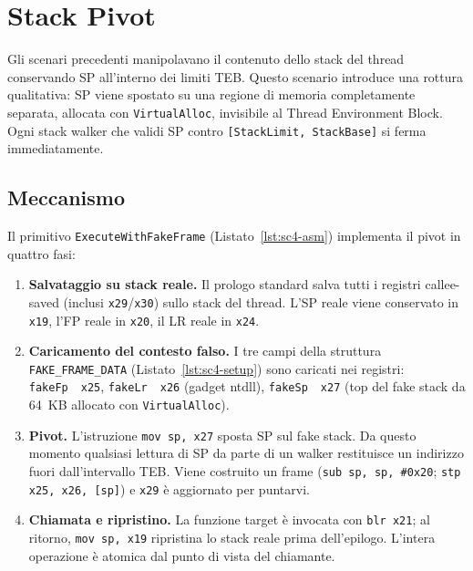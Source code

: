 
\section{Stack Pivot}
\label{sec:sc4}

Gli scenari precedenti manipolavano il contenuto dello stack del thread
conservando SP all'interno dei limiti TEB. Questo scenario introduce una
rottura qualitativa: SP viene spostato su una regione di memoria completamente
separata, allocata con \texttt{VirtualAlloc}, invisibile al Thread Environment
Block. Ogni stack walker che validi SP contro
\texttt{[StackLimit, StackBase]} si ferma immediatamente.

\subsection{Meccanismo}

Il primitivo \texttt{ExecuteWithFakeFrame} (Listato~\ref{lst:sc4-asm})
implementa il pivot in quattro fasi:

\begin{enumerate}
  \item \textbf{Salvataggio su stack reale.} Il prologo standard salva tutti
        i registri callee-saved (inclusi \texttt{x29}/\texttt{x30}) sullo
        stack del thread. L'SP reale viene conservato in \texttt{x19},
        l'FP reale in \texttt{x20}, il LR reale in \texttt{x24}.

  \item \textbf{Caricamento del contesto falso.} I tre campi della struttura
        \texttt{FAKE\_FRAME\_DATA} (Listato~\ref{lst:sc4-setup}) sono
        caricati nei registri: \texttt{fakeFp}~\textrightarrow~\texttt{x25},
        \texttt{fakeLr}~\textrightarrow~\texttt{x26} (gadget ntdll),
        \texttt{fakeSp}~\textrightarrow~\texttt{x27} (top del fake stack da
        64~KB allocato con \texttt{VirtualAlloc}).

  \item \textbf{Pivot.} L'istruzione \texttt{mov sp, x27} sposta SP sul fake
        stack. Da questo momento qualsiasi lettura di SP da parte di un
        walker restituisce un indirizzo fuori dall'intervallo TEB. Viene
        costruito un frame (\texttt{sub sp, sp, \#0x20};
        \texttt{stp x25, x26, [sp]}) e \texttt{x29} è aggiornato per
        puntarvi.

  \item \textbf{Chiamata e ripristino.} La funzione target è invocata con
        \texttt{blr x21}; al ritorno, \texttt{mov sp, x19} ripristina lo
        stack reale prima dell'epilogo. L'intera operazione è atomica dal
        punto di vista del chiamante.
\end{enumerate}

